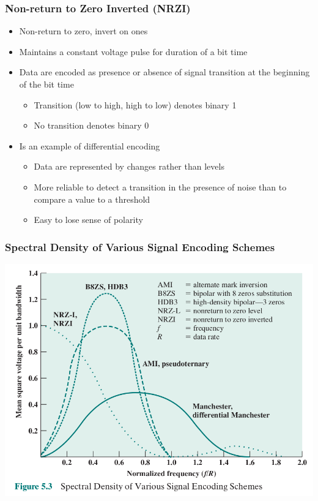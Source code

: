 \documentclass[pdflatex,compress]{beamer}
\begin{document}
\begin{frame}
	\frametitle{Non-return to Zero Inverted (NRZI)}
	\begin{itemize}
		\item Non-return to zero, invert on ones
		\item Maintains a constant voltage pulse for duration of a bit time
		\item Data are encoded as presence or absence of signal transition at the beginning of the bit time
		\begin{itemize}
			\item Transition (low to high, high to low) denotes binary 1
			\item No transition denotes binary 0
		\end{itemize}
		\item Is an example of differential encoding
		\begin{itemize}
			\item Data are represented by changes rather than levels
			\item More reliable to detect a transition in the presence of noise than to compare a value to a threshold
			\item Easy to lose sense of polarity
		\end{itemize}
	\end{itemize}
\end{frame}

\begin{frame}
	\frametitle{Spectral Density of Various Signal Encoding Schemes}
	\begin{center}
		\includegraphics[width=0.8\linewidth]{img/img05}
	\end{center}
\end{frame}
\end{document}
